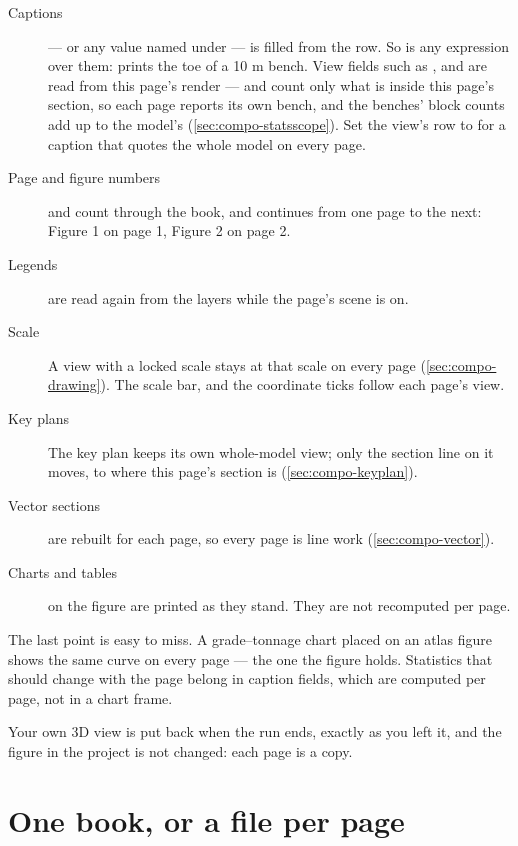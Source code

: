 \begin{description}
\item[Captions]  — or any value named under  — is filled from the row. So is any expression over them:  prints the toe of a 10 m bench. View fields such as ,  and  are read from this page's render — and count only what is inside this page's section, so each page reports its own bench, and the benches' block counts add up to the model's (\cref{sec:compo-statsscope}). Set the view's  row to  for a caption that quotes the whole model on every page.
\item[Page and figure numbers]  and  count through the book, and  continues from one page to the next: Figure 1 on page 1, Figure 2 on page 2.
\item[Legends] are read again from the layers while the page's scene is on.
\item[Scale] A view with a locked scale stays at that scale on every page (\cref{sec:compo-drawing}). The scale bar,  and the coordinate ticks follow each page's view.
\item[Key plans] The key plan keeps its own whole-model view; only the section line on it moves, to where this page's section is (\cref{sec:compo-keyplan}).
\item[Vector sections] are rebuilt for each page, so every page is line work (\cref{sec:compo-vector}).
\item[Charts and tables] on the figure are printed as they stand. They are not recomputed per page.
\end{description}

\begin{caution}
The last point is easy to miss. A grade–tonnage chart placed on an atlas figure shows the same curve on every page — the one the figure holds. Statistics that should change with the page belong in caption fields, which are computed per page, not in a chart frame.
\end{caution}

Your own 3D view is put back when the run ends, exactly as you left it, and the figure in the project is not changed: each page is a copy.

\section{One book, or a file per page}\label{sec:atlas-out}

